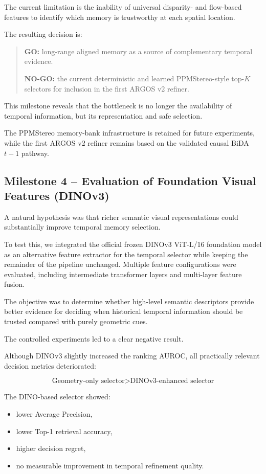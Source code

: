 \documentclass[11pt,a4paper]{article}
\begin{document}
The current limitation is the inability of universal disparity- and flow-based features to identify which memory is trustworthy at each spatial location.

The resulting decision is:

\begin{quote}
\textbf{GO:} long-range aligned memory as a source of complementary temporal evidence.

\textbf{NO-GO:} the current deterministic and learned PPMStereo-style top-\(K\) selectors for inclusion in the first ARGOS v2 refiner.
\end{quote}

This milestone reveals that the bottleneck is no longer the availability of temporal information, but its representation and safe selection.

The PPMStereo memory-bank infrastructure is retained for future experiments, while the first ARGOS v2 refiner remains based on the validated causal BiDA \(t-1\) pathway.

\subsection{Milestone 4 -- Evaluation of Foundation Visual Features (DINOv3)}

A natural hypothesis was that richer semantic visual representations could substantially improve temporal memory selection.

To test this, we integrated the official frozen DINOv3 ViT-L/16 foundation model as an alternative feature extractor for the temporal selector while keeping the remainder of the pipeline unchanged. Multiple feature configurations were evaluated, including intermediate transformer layers and multi-layer feature fusion.

The objective was to determine whether high-level semantic descriptors provide better evidence for deciding when historical temporal information should be trusted compared with purely geometric cues.

The controlled experiments led to a clear negative result.

Although DINOv3 slightly increased the ranking AUROC, all practically relevant decision metrics deteriorated:

\[
\text{Geometry-only selector}
>
\text{DINOv3-enhanced selector}
\]

The DINO-based selector showed:

\begin{itemize}
    \item lower Average Precision,
    \item lower Top-1 retrieval accuracy,
    \item higher decision regret,
    \item no measurable improvement in temporal refinement quality.
\end{itemize}
\end{document}

